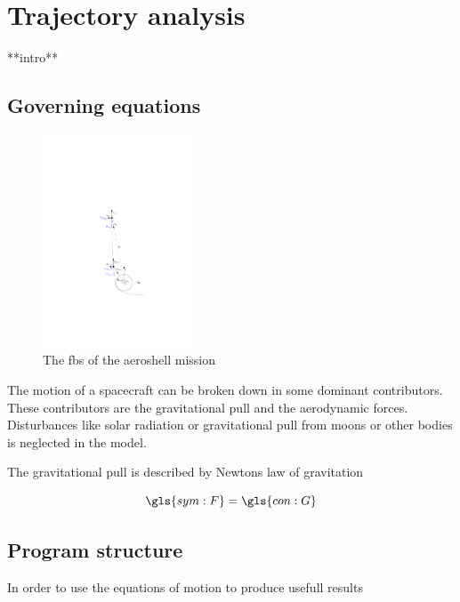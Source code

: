\section{Trajectory analysis} \label{ch:trajectory}

**intro**

\subsection{Governing equations}\label{sec:gov}

\begin{figure}
		\centering
		\includegraphics[width = 0.4\textwidth]{Figure/orbital_mechanics.pdf}
		\caption{The \gls{fbs} of the aeroshell mission}
		\label{fig:orb}
\end{figure}

The motion of a spacecraft can be broken down in some dominant contributors. These contributors are the gravitational pull and the aerodynamic forces. Disturbances like solar radiation or gravitational pull from moons or other bodies is neglected in the model.

The gravitational pull is described by Newtons law of gravitation

\begin{equation}
\gls{sym:F} = \gls{con:G}
\end{equation}

\subsection{Program structure}\label{sec:prog_struct}

In order to use the equations of motion to produce usefull results

